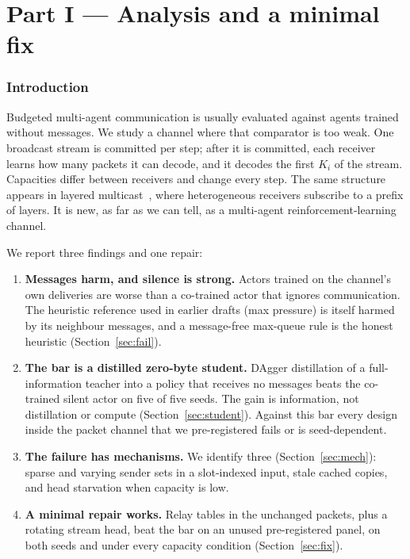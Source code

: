 \documentclass[11pt]{article}
\theoremstyle{definition}
\begin{document}
\part*{Part I --- Analysis and a minimal fix}

\section{Introduction}\label{sec:intro}
Budgeted multi-agent communication is usually evaluated against agents trained without messages. We study a channel
where that comparator is too weak. One broadcast stream is committed per step; after it is committed, each receiver
learns how many packets it can decode, and it decodes the first $K_i$ of the stream. Capacities differ between receivers
and change every step. The same structure appears in layered multicast~\cite{rlm}, where heterogeneous receivers
subscribe to a prefix of layers. It is new, as far as we can tell, as a multi-agent reinforcement-learning channel.

We report three findings and one repair:
\begin{enumerate}
\item \textbf{Messages harm, and silence is strong.} Actors trained on the channel's own deliveries are worse than a
co-trained actor that ignores communication. The heuristic reference used in earlier drafts (max pressure) is itself
harmed by its neighbour messages, and a message-free max-queue rule is the honest heuristic (Section~\ref{sec:fail}).
\item \textbf{The bar is a distilled zero-byte student.} DAgger distillation of a full-information teacher into a policy
that receives no messages beats the co-trained silent actor on five of five seeds. The gain is information, not
distillation or compute (Section~\ref{sec:student}). Against this bar every design inside the packet channel that we
pre-registered fails or is seed-dependent.
\item \textbf{The failure has mechanisms.} We identify three (Section~\ref{sec:mech}): sparse and varying sender sets in a
slot-indexed input, stale cached copies, and head starvation when capacity is low.
\item \textbf{A minimal repair works.} Relay tables in the unchanged packets, plus a rotating stream head, beat the bar
on an unused pre-registered panel, on both seeds and under every capacity condition (Section~\ref{sec:fix}).
\end{enumerate}
\end{document}
